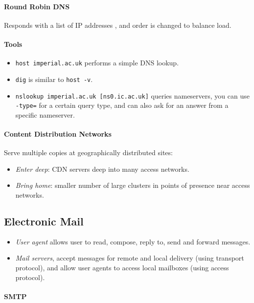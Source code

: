 \documentclass[twocolumn,english]{article}
\begin{document}
\paragraph{Round Robin DNS}

Responds with a list of IP addresses , and order is changed to balance
load.

\paragraph{Tools}
\begin{itemize}
\item \texttt{host imperial.ac.uk} performs a simple DNS lookup.
\item \texttt{dig} is similar to \texttt{host -v}.
\item \texttt{nslookup imperial.ac.uk {[}ns0.ic.ac.uk{]}} queries nameservers,
you can use \texttt{-type=} for a certain query type, and can also
ask for an answer from a specific nameserver.
\end{itemize}

\paragraph{Content Distribution Networks}

Serve multiple copies at geographically distributed sites:
\begin{itemize}
\item \emph{Enter deep}: CDN servers deep into many access networks.
\item \emph{Bring home}: smaller number of large clusters in points of presence
near access networks.
\end{itemize}

\subsection{Electronic Mail}
\begin{itemize}
\item \emph{User agent} allows user to read, compose, reply to, send and
forward messages.
\item \emph{Mail servers}, accept messages for remote and local delivery
(using transport protocol), and allow user agents to access local
mailboxes (using access protocol).
\end{itemize}

\paragraph{SMTP}
\end{document}
